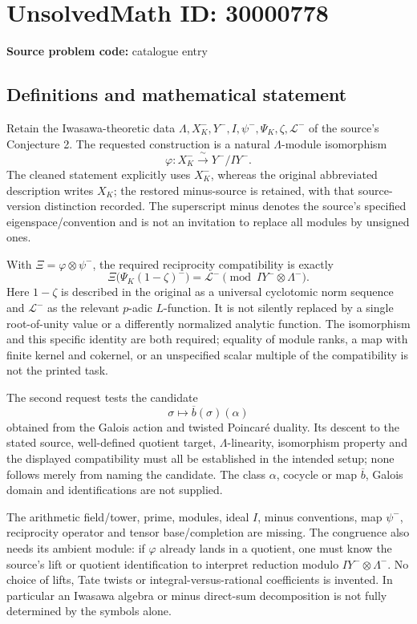\documentclass[11pt]{article}
\begin{document}
\section*{UnsolvedMath ID: 30000778}
\textbf{Source problem code:} catalogue entry
\subsection{Definitions and mathematical statement}
Retain the Iwasawa-theoretic data \(\Lambda,X_K^-,Y^-,I,\psi^-,\Psi_K,\zeta,\mathcal L^-\) of the source's Conjecture 2. The requested construction is a natural \(\Lambda\)-module isomorphism
\[
 \varphi:X_K^-\xrightarrow{\ \sim\ }Y^-/IY^-.
\]
The cleaned statement explicitly uses \(X_K^-\), whereas the original abbreviated description writes \(X_K\); the restored minus-source is retained, with that source-version distinction recorded. The superscript minus denotes the source's specified eigenspace/convention and is not an invitation to replace all modules by unsigned ones.

With \(\Xi=\varphi\otimes\psi^-\), the required reciprocity compatibility is exactly
\[
 \Xi\bigl(\Psi_K(1-\zeta)^-\bigr)=\mathcal L^-
 \pmod{IY^-\otimes\Lambda^-}.
\]
Here \(1-\zeta\) is described in the original as a universal cyclotomic norm sequence and \(\mathcal L^-\) as the relevant \(p\)-adic \(L\)-function. It is not silently replaced by a single root-of-unity value or a differently normalized analytic function. The isomorphism and this specific identity are both required; equality of module ranks, a map with finite kernel and cokernel, or an unspecified scalar multiple of the compatibility is not the printed task.

The second request tests the candidate
\[
 \sigma\longmapsto\overline b(\sigma)(\alpha)
\]
obtained from the Galois action and twisted Poincar\'e duality. Its descent to the stated source, well-defined quotient target, \(\Lambda\)-linearity, isomorphism property and the displayed compatibility must all be established in the intended setup; none follows merely from naming the candidate. The class \(\alpha\), cocycle or map \(\overline b\), Galois domain and identifications are not supplied.

The arithmetic field/tower, prime, modules, ideal \(I\), minus conventions, map \(\psi^-\), reciprocity operator and tensor base/completion are missing. The congruence also needs its ambient module: if \(\varphi\) already lands in a quotient, one must know the source's lift or quotient identification to interpret reduction modulo \(IY^-\otimes\Lambda^-\). No choice of lifts, Tate twists or integral-versus-rational coefficients is invented. In particular an Iwasawa algebra or minus direct-sum decomposition is not fully determined by the symbols alone.
\end{document}
